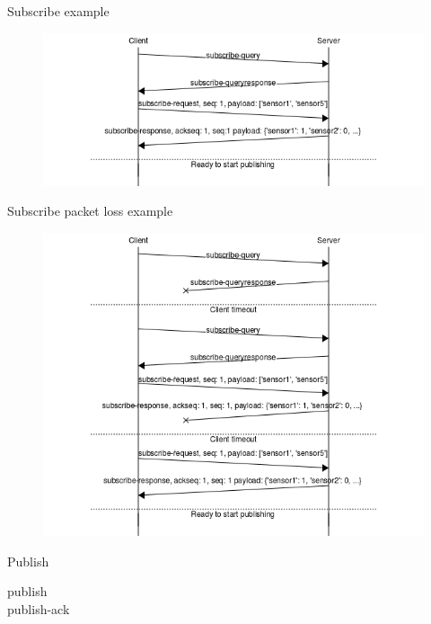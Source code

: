 \documentclass{beamer}
\begin{document}
\begin{frame}{Subscribe example}
\begin{figure}
	\includegraphics[width=\textwidth]{figures/subscribe_normal.png}
\end{figure}
\end{frame}

\begin{frame}{Subscribe packet loss example}
\begin{figure}
	\includegraphics[width=\textwidth]{figures/subscribe_lost.png}
\end{figure}
\end{frame}

\begin{frame}{Publish}
\begin{description}
	\item[publish]
    \item[publish-ack]
\end{description}
\end{frame}
\end{document}

